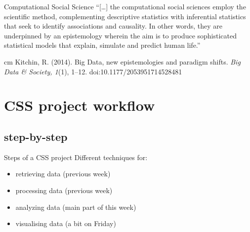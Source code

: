 \documentclass{beamer}
\begin{document}
\begin{frame}{Computational Social Science}
``[\ldots] the computational social sciences employ the scientific method, complementing descriptive statistics with inferential statistics that seek to identify associations and causality. In other words, they are underpinned by an epistemology wherein the aim is to produce sophisticated statistical models that explain, simulate and predict human life.''

 cm
\tiny{Kitchin, R. (2014). Big Data, new epistemologies and paradigm shifts. \textit{Big Data \& Society, 1}(1), 1–12. doi:10.1177/2053951714528481}
\end{frame}


\section{CSS project workflow}
\subsection{step-by-step}
\begin{frame}{Steps of a CSS project}
Different techniques for:
\begin{itemize}
	\item retrieving data (previous week)
	\item processing data (previous week)
	\item analyzing data (main part of this week)
	\item visualising data (a bit on Friday)
\end{itemize}

\end{frame}
\end{document}
